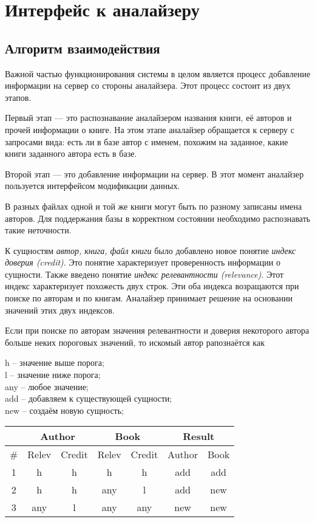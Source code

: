 \section{Интерфейс к аналайзеру}


\subsection{Алгоритм взаимодействия}

Важной частью функционирования системы в целом является процесс добавление информации на сервер со стороны аналайзера. Этот процесс состоит из двух этапов. 

Первый этап --- это распознавание аналайзером названия книги, её авторов и прочей информации о книге. На этом этапе аналайзер обращается к серверу с запросами вида: есть ли в базе автор с именем, похожим на заданное, какие книги заданного автора есть в базе.

Второй этап --- это добавление информации на сервер. В этот момент аналайзер пользуется интерфейсом модификации данных.


В разных файлах одной и той же книги могут быть по разному записаны имена авторов. Для поддержания базы в корректном состоянии необходимо распознавать такие неточности.

К сущностям {\em автор, книга, файл книги} было добавлено новое понятие {\em индекс доверия (credit)}. Это понятие характеризует проверенность информации о сущности.
Также введено понятие {\em индекс релевантности (relevance)}. Этот индекс характеризует похожесть двух строк.
Эти оба индекса возращаются при поиске по авторам и по книгам.
Аналайзер принимает решение на основании значений этих двух индексов.

Если при поиске по авторам значения релевантности и доверия некоторого автора
больше неких пороговых значений,
то искомый автор рапознаётся как 



h -- значение выше порога;\\
l -- значение ниже порога;\\
any -- любое значение;\\
add -- добавляем к существующей сущности; \\
new -- создаём новую сущность;\\


  \begin{tabular}{ | c | c | c | c | c || c | c |}
  \hline
   & \multicolumn{2}{c|}{Author} & \multicolumn{2}{c||}{Book} & \multicolumn{2}{c|}{Result} \\
    \hline
      \# & Relev & Credit & Relev & Credit & Author & Book \\ \hline
      1 & h   & h   & h   & h   & add & add \\ \hline
      2 & h   & h   & any & l   & add & new \\ \hline
      3 & any & l   & any & any & new & new \\
    \hline
  \end{tabular}


